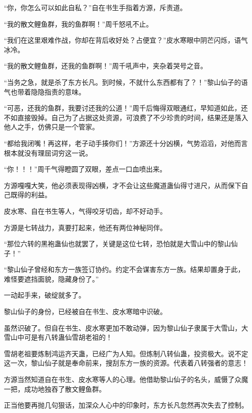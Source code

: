
\begin{this_body}



“你，你怎么可以如此自私？”自在书生手指着方源，斥责道。

“我的散文鲤鱼群，我的鱼群啊！”周千怒吼不止。

“我们在这里艰难作战，你却在背后收好处？占便宜？”皮水寒眼中阴芒闪烁，语气冰冷。

“我的散文鲤鱼群，还我的鱼群啊！”周千吼声中，夹杂着哭号之音。

“当务之急，就是杀了东方长凡。到时候，不就什么东西都有了？！”黎山仙子的语气也带着隐隐指责的意味。

“可恶，还我的鱼群，我要讨还我的公道！”周千后悔得双眼通红，早知道如此，还不如直接毁掉。自己为了占据这处资源，可浪费了不少珍贵的时间，结果还是落入他人之手，仿佛只是一个管家。

“都给我闭嘴！再这样，老子动手揍你们！”方源还十分凶横，气势滔滔，对他而言根本就没有理屈词穷这一说。

“你！！！”周千气得瞪圆了双眼，差点一口血喷出来。

方源嘎嘎大笑，他必须表现得凶横，才不会让这些魔道蛊仙得寸进尺，从而保下自己既得的利益。

皮水寒、自在书生等人，气得咬牙切齿，却不好动手。

方源是七转战力，真要打起来，他还有两位神秘同伴。

“那位六转的黑袍蛊仙也就罢了，关键是这位七转，恐怕就是大雪山中的黎山仙子！”

“黎山仙子曾经和东方一族签订协约。约定不会谋害东方一族。结果却置身于此，难怪要遮挡面貌，隐藏身份了。”

一动起手来，破绽就多了。

黎山仙子的身份，已经被自在书生、皮水寒暗中识破。

虽然识破了。但自在书生、皮水寒更加不敢动弹，因为黎山仙子隶属于大雪山，大雪山中可是有八转蛊仙雪胡老祖的！

雪胡老祖要炼制鸿运齐天蛊，已经广为人知。但炼制八转仙蛊，投资极大。说不定这一次，黎山仙子就是奉命前来，搜刮东方一族的资源。代表着八转强者的意志！

方源当然知道自在书生、皮水寒等人的心理。他借助黎山仙子的名头，威慑了众魔一把，成功地独吞了散文鲤鱼群。

正当他要再抛几句狠话，加深众人心中的印象时，东方长凡忽然再次失去了控制。


\end{this_body}
